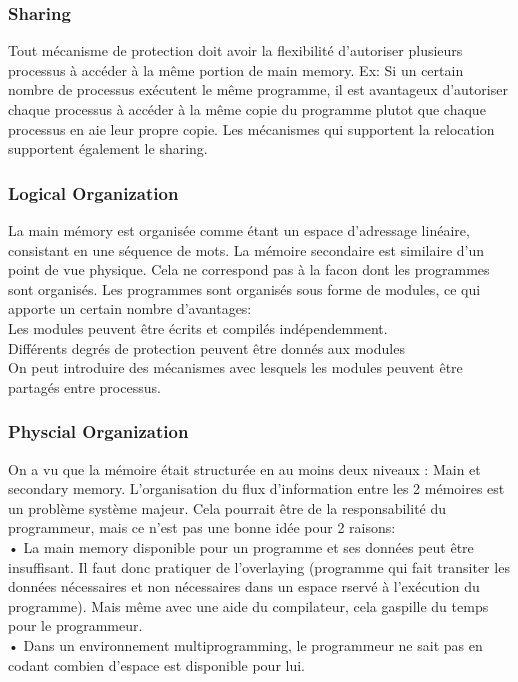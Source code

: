 \subsubsection{Sharing}
Tout mécanisme de protection doit avoir la flexibilité d’autoriser plusieurs processus à accéder à la même portion de main memory. Ex: Si un certain nombre de processus exécutent le même programme, il est avantageux d’autoriser chaque processus à accéder à la même copie du programme plutot que chaque processus en aie leur propre copie. Les mécanismes qui supportent la relocation supportent également le sharing.
\subsubsection{Logical Organization}
La main mémory est organisée comme étant un espace d’adressage linéaire, consistant en une séquence de mots. La mémoire secondaire est similaire d’un point de vue physique. Cela ne correspond pas à la facon dont les programmes sont organisés. Les programmes sont organisés sous forme de modules, ce qui apporte un certain nombre d’avantages: \\
Les modules peuvent être écrits et compilés indépendemment.  \\
Différents degrés de protection peuvent être donnés aux modules \\
On peut introduire des mécanismes avec lesquels les modules peuvent être partagés entre processus.
\subsubsection{Physcial Organization}
On a vu que la mémoire était structurée en au moins deux niveaux : Main et secondary memory. L’organisation du flux d’information entre les 2 mémoires est un problème système majeur. Cela pourrait être de la responsabilité du programmeur, mais ce n’est pas une bonne idée pour 2 raisons: \\
• La main memory disponible pour un programme et ses données peut être insuffisant. Il faut donc pratiquer de l’overlaying (programme qui fait transiter les données nécessaires et non nécessaires dans un espace rservé à l’exécution du programme). Mais même avec une aide du compilateur, cela gaspille du temps pour le programmeur. \\
• Dans un environnement multiprogramming, le programmeur ne sait pas en codant combien d’espace est disponible pour lui.
